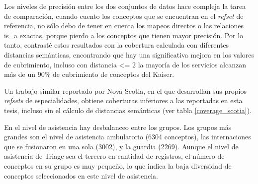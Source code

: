 Los niveles de precisión entre los dos conjuntos de datos hace compleja la tarea de comparación, cuando cuento los conceptos que se encuentran en el \textit{refset} de referencia, no sólo debo de tener en cuenta los mapeos directos o las relaciones is\_a exactas, porque pierdo a los conceptos que tienen mayor precisión. Por lo tanto, contrasté estos resultados con la cobertura calculada con diferentes distancias semánticas, encontrando que hay una significativa mejora en los valores de cubrimiento, incluso con distancia \textless= 2 la mayoría de los servicios alcanzan más de un 90\% de cubrimiento de conceptos del Kaiser.

Un trabajo similar reportado por Nova Scotia\cite{nova}, en el que desarrollan sus propios \textit{refsets} de especialidades, obtiene coberturas inferiores a las reportadas en esta tesis, incluso sin el cálculo de distancias semánticas (ver tabla \ref{coverage_scotia}). 

\begin{table}
 \caption{Comparación de la cobertura de las especialidades del HIBA vs Nova Scotia }
  \label{coverage_scotia}
\end{table}

En el nivel de asistencia hay desbalanceo entre los grupos. Los grupos más grandes son el nivel de asistencia ambulatorio (6304 conceptos), las internaciones que se fusionaron en una sola (3002), y la guardia (2269). Aunque el nivel de asistencia de Triage sea el tercero en cantidad de registros, el número de conceptos en su grupo es muy pequeño, lo que indica la baja diversidad de conceptos seleccionados en este nivel de asistencia. 

